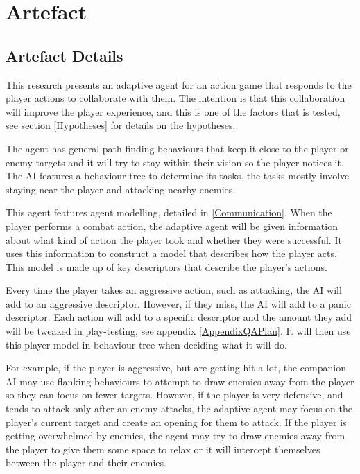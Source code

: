 \documentclass{IEEEtran}
\begin{document}
\section{Artefact}
\label{Artefact}

\subsection{Artefact Details}
\label{ArtefactDetails}


This research presents an adaptive agent for an action game that responds to the player actions to collaborate with them. The intention is that this collaboration will improve the player experience, and this is one of the factors that is tested, see section \ref{Hypotheses} for details on the hypotheses.

The agent has general path-finding behaviours that keep it close to the player or enemy targets and it will try to stay within their vision so the player notices it. The AI features a behaviour tree to determine its tasks. the tasks mostly involve staying near the player and attacking nearby enemies.

This agent features agent modelling, detailed in \ref{Communication}. When the player performs a combat action, the adaptive agent will be given information about what kind of action the player took and whether they were successful. It uses this information to construct a model that describes how the player acts. This model is made up of key descriptors that describe the player's actions.

Every time the player takes an aggressive action, such as attacking, the AI will add to an aggressive descriptor. However, if they miss, the AI will add to a panic descriptor. Each action will add to a specific descriptor and the amount they add will be tweaked in play-testing, see appendix \ref{AppendixQAPlan}. It will then use this player model in behaviour tree when deciding what it will do.

For example, if the player is aggressive, but are getting hit a lot, the companion AI may use flanking behaviours to attempt to draw enemies away from the player so they can focus on fewer targets. However, if the player is very defensive, and tends to attack only after an enemy attacks, the adaptive agent may focus on the player's current target and create an opening for them to attack. If the player is getting overwhelmed by enemies, the agent may try to draw enemies away from the player to give them some space to relax or it will intercept themselves between the player and their enemies.
\end{document}
